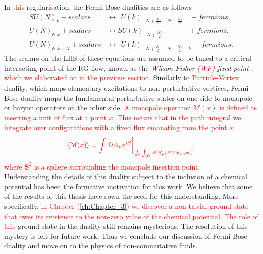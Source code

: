         \indent In \textcolor{red}{this} regulari\textcolor{red}{s}ation\textcolor{red}{,} the Fermi-Bose dualities are as follows \cite{Aharony:2015mjs} 
            \begin{align}
                SU(N)_k + scalars &\longleftrightarrow \ \ U(k)_{-N +\frac{N_f}{2}, -N + \frac{N_f}{2}} \quad + fermions, \label{eq:Fermi-Bose_1} \\
                U(N)_{k,k} + scalars &\longleftrightarrow SU(k)_{-N +\frac{N_f}{2}}\qquad \ \ \ \quad+ fermions,  \label{eq:Fermi-Bose_2}\\
                U(N)_{k,k+N} + scalars &\longleftrightarrow \ \ U(k)_{-N +\frac{N_f}{2}, -N + \frac{N_f}{2}-k} \ + fermions.  \label{eq:Fermi-Bose_3}
            \end{align}
            The scalars on the LHS of these equations are assumed to be tuned to a critical interacting point of the RG flow, known as the \textit{Wilson-Fisher \textcolor{red}{(WF)} fixed point} \cite{Wilson:1971dc}\textcolor{red}{, which we elaborated on in the previous section.} Similarly to \textcolor{red}{Particle-Vortex} duality, which maps elementary excitations to non-perturbative vortices, Fermi-Bose duality maps the fundamental perturbative states on one side to monopole or baryon operators on the other side. \textcolor{red}{A monopole operator $\mathcal{M}(x)$ is defined as inserting a unit of flux at a point $x$. This means that in the path integral we integrate over configurations with a fixed flux emanating from the point $x$} \\
\begin{align}
    \textcolor{red}{ \langle \mathcal{M}(x) \rangle = \int \mathcal{D}A_{\mu} e^{i S}\bigg |_{\frac{1}{4\pi} \int_{\textbf{S}^2} d^2S_{\mu} \epsilon^{\mu \nu \rho}F_{\nu \rho} =1}, }
\end{align}
    \textcolor{red}{where $\mathbf{S}^2$ is a sphere surrounding the monopole insertion point.} \\
            \indent Understanding the details of this duality subject to the inclusion of a chemical potential has been the formative motivation for this work. We believe that some of the results of this thesis have sown the seed for this understanding. More specifically, \textcolor{red}{in Chapter (\ref{ch:Chapter_3}) we discover a non-trivial ground state that owes its existence to the non-zero value of the chemical potential. The role of this }ground state in the duality still remains mysterious. The resolution of this mystery is left for future work. Thus we conclude our discussion of Fermi-Bose duality and move on to the physics of non-commutative fluids\textcolor{red}{.}
